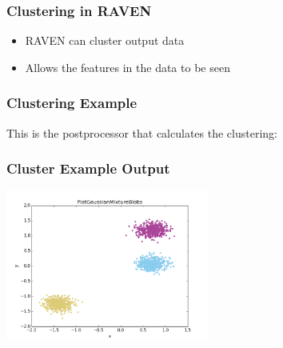\documentclass[t,9pt,svgnames]{beamer}
\begin{document}
\begin{frame}
  \frametitle{Clustering in RAVEN}
  \begin{itemize}
  \item RAVEN can cluster output data
  \item Allows the features in the data to be seen
  \end{itemize}
\end{frame}

\begin{frame}[fragile]
  \frametitle{Clustering Example}
  This is the postprocessor that calculates the clustering:
  

\end{frame}

\begin{frame}
  \frametitle{Cluster Example Output}
  \includegraphics[height=5cm]{images/PlotGaussianMixture.png}
\end{frame}
\end{document}
